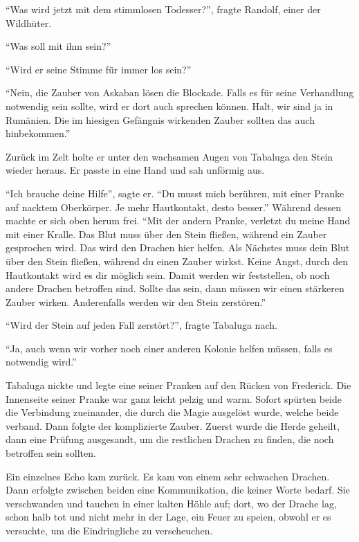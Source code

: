 \enquote{Was wird jetzt mit dem stimmlosen Todesser?}, fragte Randolf, einer der Wildhüter.

\enquote{Was soll mit ihm sein?}

\enquote{Wird er seine Stimme für immer los sein?}

\enquote{Nein, die Zauber von Askaban lösen die Blockade. Falls es für seine Verhandlung notwendig sein sollte, wird er dort auch sprechen können. Halt, wir sind ja in Rumänien. \gst Die im hiesigen Gefängnis wirkenden Zauber sollten das auch hinbekommen.}

Zurück im Zelt holte er unter den wachsamen Augen von Tabaluga den Stein wieder heraus. Er passte in eine Hand und sah unförmig aus.

\enquote{Ich brauche deine Hilfe}, sagte er. \enquote{Du musst mich berühren, mit einer Pranke auf nacktem Oberkörper. Je mehr Hautkontakt, desto besser.} Während dessen machte er sich oben herum frei. \enquote{Mit der andern Pranke, verletzt du meine Hand mit einer Kralle. Das Blut muss über den Stein fließen, während ein Zauber gesprochen wird. Das wird den Drachen hier helfen. Als Nächstes muss dein Blut über den Stein fließen, während du einen Zauber wirkst. Keine Angst, durch den Hautkontakt wird es dir möglich sein. Damit werden wir feststellen, ob noch andere Drachen betroffen sind. Sollte das sein, dann müssen wir einen stärkeren Zauber wirken. Anderenfalls werden wir den Stein zerstören.}

\enquote{Wird der Stein auf jeden Fall zerstört?}, fragte Tabaluga nach.

\enquote{Ja, auch wenn wir vorher noch einer anderen Kolonie helfen müssen, falls es notwendig wird.}

Tabaluga nickte und legte eine seiner Pranken auf den Rücken von Frederick. Die Innenseite seiner Pranke war ganz leicht pelzig und warm. Sofort spürten beide die Verbindung zueinander, die durch die Magie ausgelöst wurde, welche beide verband. Dann folgte der komplizierte Zauber. Zuerst wurde die Herde geheilt, dann eine Prüfung ausgesandt, um die restlichen Drachen zu finden, die noch betroffen sein sollten.

Ein einzelnes Echo kam zurück. Es kam von einem sehr schwachen Drachen. Dann erfolgte zwischen beiden eine Kommunikation, die keiner Worte bedarf. Sie verschwanden und tauchen in einer kalten Höhle auf; dort, wo der Drache lag, schon halb tot und nicht mehr in der Lage, ein Feuer zu speien, obwohl er es versuchte, um die Eindringliche zu verscheuchen.

